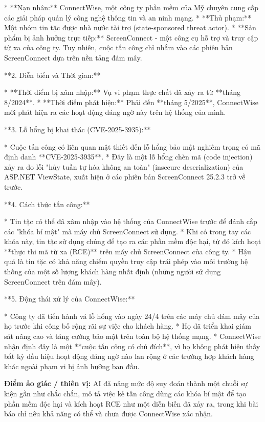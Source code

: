 * **Nạn nhân:** ConnectWise, một công ty phần mềm của Mỹ chuyên cung cấp các giải pháp quản lý công nghệ thông tin và an ninh mạng.
* **Thủ phạm:** Một nhóm tin tặc được nhà nước tài trợ (state-sponsored threat actor).
* **Sản phẩm bị ảnh hưởng trực tiếp:** ScreenConnect - một công cụ hỗ trợ và truy cập từ xa của công ty. Tuy nhiên, cuộc tấn công chỉ nhắm vào các phiên bản ScreenConnect dựa trên nền tảng đám mây.

**2. Diễn biến và Thời gian:**

* **Thời điểm bị xâm nhập:** Vụ vi phạm thực chất đã xảy ra từ **tháng 8/2024**.
* **Thời điểm phát hiện:** Phải đến **tháng 5/2025**, ConnectWise mới phát hiện ra các hoạt động đáng ngờ này trên hệ thống của mình.

**3. Lỗ hổng bị khai thác (CVE-2025-3935):**

* Cuộc tấn công có liên quan mật thiết đến lỗ hổng bảo mật nghiêm trọng có mã định danh **CVE-2025-3935**.
* Đây là một lỗ hổng chèn mã (code injection) xảy ra do lỗi "hủy tuần tự hóa không an toàn" (insecure deserialization) của ASP.NET ViewState, xuất hiện ở các phiên bản ScreenConnect 25.2.3 trở về trước.

**4. Cách thức tấn công:**

* Tin tặc có thể đã xâm nhập vào hệ thống của ConnectWise trước để đánh cắp các "khóa bí mật" mà máy chủ ScreenConnect sử dụng.
* Khi có trong tay các khóa này, tin tặc sử dụng chúng để tạo ra các phần mềm độc hại, từ đó kích hoạt **thực thi mã từ xa (RCE)** trên máy chủ ScreenConnect của công ty.
* Hậu quả là tin tặc có khả năng chiếm quyền truy cập trái phép vào môi trường hệ thống của một số lượng khách hàng nhất định (những người sử dụng ScreenConnect trên đám mây).

**5. Động thái xử lý của ConnectWise:**

* Công ty đã tiến hành vá lỗ hổng vào ngày 24/4 trên các máy chủ đám mây của họ trước khi công bố rộng rãi sự việc cho khách hàng.
* Họ đã triển khai giám sát nâng cao và tăng cường bảo mật trên toàn bộ hệ thống mạng.
* ConnectWise nhận định đây là một **cuộc tấn công có chủ đích**, vì họ không phát hiện thấy bất kỳ dấu hiệu hoạt động đáng ngờ nào lan rộng ở các trường hợp khách hàng khác ngoài phạm vi bị ảnh hưởng ban đầu.

\textbf{Điểm ảo giác / thiên vị:}
AI đã nâng mức độ suy đoán thành một chuỗi sự kiện gần như chắc chắn, mô tả việc kẻ tấn công dùng các khóa bí mật để tạo phần mềm độc hại và kích hoạt RCE như một diễn biến đã xảy ra, trong khi bài báo chỉ nêu khả năng có thể và chưa được ConnectWise xác nhận.

